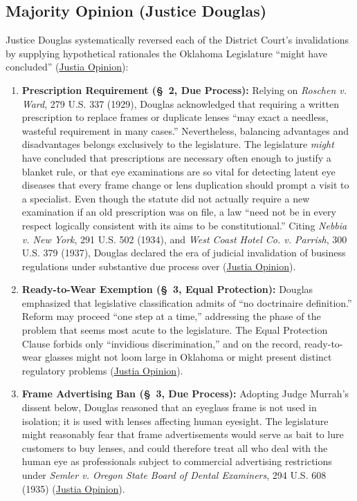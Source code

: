\documentclass[12pt]{article}
\begin{document}
\subsection{Majority Opinion (Justice Douglas)}
Justice Douglas systematically reversed each of the District Court's invalidations by supplying hypothetical rationales the Oklahoma Legislature ``might have concluded'' (\href{https://supreme.justia.com/cases/federal/us/348/483/}{Justia Opinion}):
\begin{enumerate}
    \item \textbf{Prescription Requirement (\S~2, Due Process):} Relying on \textit{Roschen v. Ward}, 279 U.S. 337 (1929), Douglas acknowledged that requiring a written prescription to replace frames or duplicate lenses ``may exact a needless, wasteful requirement in many cases.'' Nevertheless, balancing advantages and disadvantages belongs exclusively to the legislature. The legislature \textit{might} have concluded that prescriptions are necessary often enough to justify a blanket rule, or that eye examinations are so vital for detecting latent eye diseases that every frame change or lens duplication should prompt a visit to a specialist. Even though the statute did not actually require a new examination if an old prescription was on file, a law ``need not be in every respect logically consistent with its aims to be constitutional.'' Citing \textit{Nebbia v. New York}, 291 U.S. 502 (1934), and \textit{West Coast Hotel Co. v. Parrish}, 300 U.S. 379 (1937), Douglas declared the era of judicial invalidation of business regulations under substantive due process over (\href{https://supreme.justia.com/cases/federal/us/348/483/}{Justia Opinion}).
    \item \textbf{Ready-to-Wear Exemption (\S~3, Equal Protection):} Douglas emphasized that legislative classification admits of ``no doctrinaire definition.'' Reform may proceed ``one step at a time,'' addressing the phase of the problem that seems most acute to the legislature. The Equal Protection Clause forbids only ``invidious discrimination,'' and on the record, ready-to-wear glasses might not loom large in Oklahoma or might present distinct regulatory problems (\href{https://supreme.justia.com/cases/federal/us/348/483/}{Justia Opinion}).
    \item \textbf{Frame Advertising Ban (\S~3, Due Process):} Adopting Judge Murrah's dissent below, Douglas reasoned that an eyeglass frame is not used in isolation; it is used with lenses affecting human eyesight. The legislature might reasonably fear that frame advertisements would serve as bait to lure customers to buy lenses, and could therefore treat all who deal with the human eye as professionals subject to commercial advertising restrictions under \textit{Semler v. Oregon State Board of Dental Examiners}, 294 U.S. 608 (1935) (\href{https://supreme.justia.com/cases/federal/us/348/483/}{Justia Opinion}).

\end{enumerate}
\end{document}

